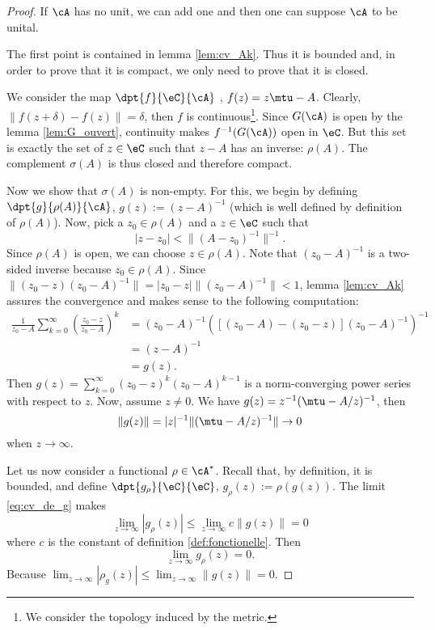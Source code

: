 \begin{proof}
	If $\cA$ has no unit, we can add one and then one can suppose $\cA$ to be unital.

	The first point is contained in lemma \ref{lem:cv_Ak}. Thus it is bounded and, in order to prove that it is compact, we only need to prove that it is closed.

	We consider the map $\dpt{f}{\eC}{\cA}$ , $f(z)=z\mtu-A$. Clearly, $\|f(z+\delta)-f(z)\|=\delta$, then $f$ is continuous\footnote{We consider the topology induced by the metric.}. Since $G(\cA)$ is open by the lemma \ref{lem:G_ouvert}, continuity makes $f^{-1}(G(\cA))$ open in $\eC$. But this set is exactly the set of $z\in\eC$ such that $z-A$ has an inverse: $\rho(A)$. The complement $\sigma(A)$ is thus closed and therefore compact.

	Now we show that $\sigma(A)$ is non-empty. For this, we begin by defining $\dpt{g}{\rho(A)}{\cA}$, 
	$g(z):=(z-A)^{-1}$ (which is well defined by definition of $ \rho(A)$). Now, pick a $z_0\in\rho(A)$ and a $z\in\eC$ such that 
	\[
	   |z-z_0|<\| (A-z_0)^{-1} \|^{-1}.
	\]
	Since $\rho(A)$ is open, we can choose $z\in\rho(A)$. Note that $(z_0-A)^{-1}$ is a two-sided inverse because $z_0\in\rho(A)$. Since $\| (z_0-z)(z_0-A)^{-1} \|=|z_0-z|\| (z_0-A)^{-1} \|<1$,  lemma \ref{lem:cv_Ak} assures the convergence and makes sense to the following computation:
	\begin{equation}
	\begin{split}   
	   \frac{1}{z_0-A}\sum_{k=0}^{\infty}(\frac{z_0-z}{z_0-A})^k
	      &=   (z_0-A)^{-1}\left(   [(z_0-A)-(z_0-z)](z_0-A)^{-1}
	       \right)^{-1}\\
	      &=(z-A) ^{-1}\\
	      &=g(z).
	\end{split}      
	\end{equation}
	Then $g(z)=\sum_{k=0}^{\infty}(z_0-z)^k(z_0-A)^{k-1}$ is a norm-converging power series with respect to $z$. Now, assume $z\neq 0$. We have $g(z)=z^{-1}(\mtu-A/z)^{-1}$, then 
	\begin{equation}\label{eq:cv_de_g}
	   \|g(z)\|=|z|^{-1}\| (\mtu-A/z)^{-1} \|\to 0 
	\end{equation}
	when $z\to\infty$.

	Let us now consider a functional $\rho\in\cA^*$. Recall that, by definition, it is bounded, and define 
	$\dpt{g_{\rho}}{\eC}{\eC}$, 
	$g_{\rho}(z):=\rho(g(z))$. The limit \eqref{eq:cv_de_g} makes 
	\[
	\lim_{z\to\infty}|g_{\rho}(z)|\leq\lim_{z\to\infty}c\|g(z)\|=0
	\]
	where $c$ is the constant of definition \ref{def:fonctionelle}. Then
	\begin{equation}\label{eq:limite_g_rho}
	  \lim_{z\to\infty}g_{\rho}(z)=0.
	\end{equation}
	Because $\lim_{z\to\infty}| \rho_g(z) |\leq\lim_{z\to\infty}\| g(z) \|=0$.


\end{proof}
